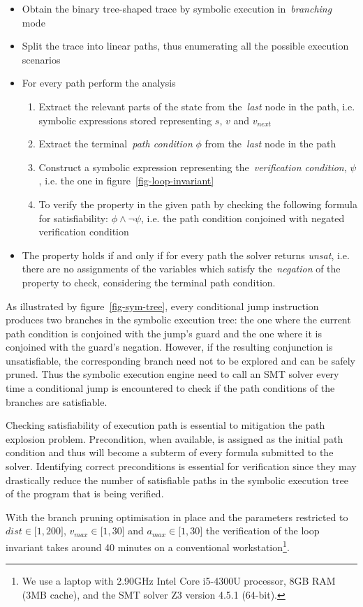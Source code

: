 \begin{itemize}
  \item Obtain the binary tree-shaped trace by symbolic execution in~\emph{branching} mode
  \item Split the trace into linear paths, thus enumerating all the possible
    execution scenarios
  \item For every path perform the analysis
    \begin{enumerate}
      \item Extract the relevant parts of the state from the~\emph{last} node in
        the path, i.e. symbolic expressions stored representing $s$,
        $v$ and $v_{next}$
      \item Extract the terminal~\emph{path condition} $\phi$
            from the~\emph{last} node in the path
      \item Construct a symbolic expression representing the~\emph{verification condition},
            $\psi$, i.e. the one in figure~\ref{fig-loop-invariant}
      \item To verify the property in the given path by checking the following
        formula for satisfiability: $\phi \land \lnot\psi$, i.e. the path condition
        conjoined with negated verification condition

    \end{enumerate}
    \item  The property holds if and only if for every path the solver returns
           \emph{unsat}, i.e. there are no assignments of the variables which
           satisfy the~\emph{negation} of the property to check, considering the
           terminal path condition.
\end{itemize}

As illustrated by figure~\ref{fig-sym-tree}, every conditional jump instruction produces
two branches in the symbolic execution tree: the one
where the current path condition is conjoined with the jump's guard and the one where it is
conjoined with the guard's negation. However, if the resulting
conjunction is unsatisfiable, the corresponding branch need not to be explored
and can be safely pruned.
Thus the symbolic execution engine need to call an SMT solver every
time a conditional jump is encountered to check if the path conditions of the branches
are satisfiable.

Checking satisfiability of execution path is essential to mitigation the path explosion
problem. Precondition, when available, is assigned as the initial path condition and thus
will become a subterm of every formula submitted to the solver.
Identifying correct preconditions is essential for verification since they may
drastically reduce the number of satisfiable paths in the symbolic execution tree
of the program that is being verified.

With the branch pruning optimisation in place and the parameters restricted
to $dist \in \mathopen[1, 200\mathclose]$, $v_{max} \in \mathopen[1, 30\mathclose]$ and
$a_{max} \in \mathopen[1, 30\mathclose]$ the verification of the loop invariant
takes around 40 minutes on a conventional workstation\footnote{We use a laptop
with 2.90GHz Intel Core i5-4300U processor, 8GB RAM (3MB cache),
and the SMT solver Z3 version 4.5.1 (64-bit).}.